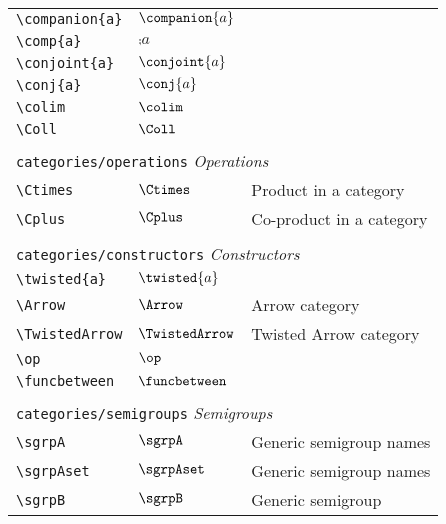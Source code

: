 \begin{longtable}{lll}
 \hline
{\color[rgb]{0.5,0.5,0.5}\texttt{\textbackslash companion\{a\}}} & $\companion{a}$ & \\ 
 {\color[rgb]{0.5,0.5,0.5}\texttt{\textbackslash comp\{a\}}} & $\comp{a}$ & \\ 
 {\color[rgb]{0.5,0.5,0.5}\texttt{\textbackslash conjoint\{a\}}} & $\conjoint{a}$ & \\ 
 {\color[rgb]{0.5,0.5,0.5}\texttt{\textbackslash conj\{a\}}} & $\conj{a}$ & \\ 
 {\color[rgb]{0.5,0.5,0.5}\texttt{\textbackslash colim}} & $\colim$ & \\ 
 {\color[rgb]{0.5,0.5,0.5}\texttt{\textbackslash Coll}} & $\Coll$ & \\ 
  &  & \\ 
 \multicolumn{3}{l}{{\color[rgb]{0.5,0.5,0.5}\texttt{categories/operations}} \emph{Operations}}\\ 
 \hline
{\color[rgb]{0.5,0.5,0.5}\texttt{\textbackslash Ctimes}} & $\Ctimes$ &  Product in a category\\ 
 {\color[rgb]{0.5,0.5,0.5}\texttt{\textbackslash Cplus}} & $\Cplus$ &  Co-product in a category\\ 
  &  & \\ 
 \multicolumn{3}{l}{{\color[rgb]{0.5,0.5,0.5}\texttt{categories/constructors}} \emph{Constructors}}\\ 
 \hline
{\color[rgb]{0.5,0.5,0.5}\texttt{\textbackslash twisted\{a\}}} & $\twisted{a}$ & \\ 
 {\color[rgb]{0.5,0.5,0.5}\texttt{\textbackslash Arrow}} & $\Arrow$ &  Arrow category\\ 
 {\color[rgb]{0.5,0.5,0.5}\texttt{\textbackslash TwistedArrow}} & $\TwistedArrow$ &  Twisted Arrow category\\ 
 {\color[rgb]{0.5,0.5,0.5}\texttt{\textbackslash op}} & $\op$ & \\ 
 {\color[rgb]{0.5,0.5,0.5}\texttt{\textbackslash funcbetween}} & $\funcbetween$ & \\ 
  &  & \\ 
 \multicolumn{3}{l}{{\color[rgb]{0.5,0.5,0.5}\texttt{categories/semigroups}} \emph{Semigroups}}\\ 
 \hline
{\color[rgb]{0.5,0.5,0.5}\texttt{\textbackslash sgrpA}} & $\sgrpA$ &  Generic semigroup names\\ 
 {\color[rgb]{0.5,0.5,0.5}\texttt{\textbackslash sgrpAset}} & $\sgrpAset$ &  Generic semigroup names\\ 
 {\color[rgb]{0.5,0.5,0.5}\texttt{\textbackslash sgrpB}} & $\sgrpB$ &  Generic semigroup\\ 

\end{longtable}
